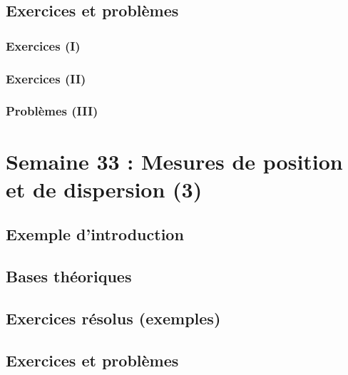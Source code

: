 \documentclass[
  12pt,
]{book}
\begin{document}
\hypertarget{exercices-et-probluxe8mes-31}{%
\section{Exercices et problèmes}\label{exercices-et-probluxe8mes-31}}

\hypertarget{exercices-i-31}{%
\subsection{Exercices (I)}\label{exercices-i-31}}

\hypertarget{exercices-ii-31}{%
\subsection{Exercices (II)}\label{exercices-ii-31}}

\hypertarget{probluxe8mes-iii-31}{%
\subsection{Problèmes (III)}\label{probluxe8mes-iii-31}}

\hypertarget{semaine-33-mesures-de-position-et-de-dispersion-3}{%
\chapter{Semaine 33 : Mesures de position et de dispersion (3)}\label{semaine-33-mesures-de-position-et-de-dispersion-3}}

\hypertarget{exemple-dintroduction-32}{%
\section{Exemple d'introduction}\label{exemple-dintroduction-32}}

\hypertarget{bases-thuxe9oriques-32}{%
\section{Bases théoriques}\label{bases-thuxe9oriques-32}}

\hypertarget{exercices-ruxe9solus-exemples-32}{%
\section{Exercices résolus (exemples)}\label{exercices-ruxe9solus-exemples-32}}

\hypertarget{exercices-et-probluxe8mes-32}{%
\section{Exercices et problèmes}\label{exercices-et-probluxe8mes-32}}
\end{document}
